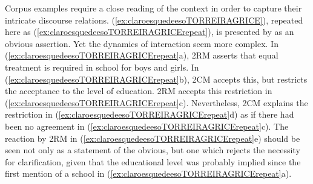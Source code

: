 \largerpage Corpus examples require a close reading of the context in order to capture their intricate discourse relations. (\ref{ex:claroesquedeesoTORREIRAGRICE}), repeated here as (\ref{ex:claroesquedeesoTORREIRAGRICErepeat}), is presented by \citet{TorreiraGrice.2018} as an obvious assertion. Yet the dynamics of interaction seem more complex. In (\ref{ex:claroesquedeesoTORREIRAGRICErepeat}a), 2RM asserts that equal treatment is required in school for boys and girls. In (\ref{ex:claroesquedeesoTORREIRAGRICErepeat}b), 2CM accepts this, but restricts the acceptance to the level of education. 2RM accepts this restriction in (\ref{ex:claroesquedeesoTORREIRAGRICErepeat}c). Nevertheless, 2CM explains the restriction in (\ref{ex:claroesquedeesoTORREIRAGRICErepeat}d) as if there had been no agreement in (\ref{ex:claroesquedeesoTORREIRAGRICErepeat}c). The reaction by 2RM in (\ref{ex:claroesquedeesoTORREIRAGRICErepeat}e) should be seen not only as a statement of the obvious, but one which rejects the necessity for clarification, given that the educational level was probably implied since the first mention of a school in (\ref{ex:claroesquedeesoTORREIRAGRICErepeat}a).

